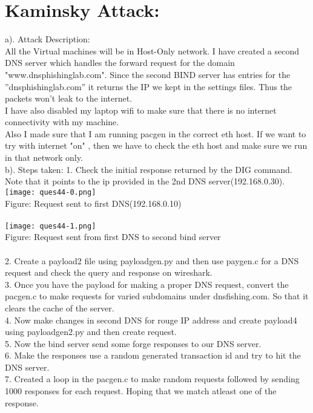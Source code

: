 \documentclass{article}
\begin{document}
\section{Kaminsky Attack:}
a). Attack Description:
\\All the Virtual machines will be in Host-Only network. I have created a second DNS server which handles the forward request for the domain "www.dnsphishinglab.com". Since the second BIND server has entries for the ”dnsphishinglab.com” it returns the IP we kept in the settings files. Thus the packets won’t leak to the internet.
\\I have also disabled my laptop wifi to make sure that there is no internet connectivity with my machine. \\
Also I made sure that I am running pacgen in the correct eth host. If we want to try with internet "on" , then we have to check the eth host and make sure we run in that network only.
\\
b). Steps taken:
1. Check the initial response returned by the DIG command. Note that it points to the ip provided in the 2nd DNS server(192.168.0.30).\\
\texttt{[image: ques44-0.png]}
\\Figure: Request sent to first DNS(192.168.0.10) 
 \\ \\
\texttt{[image: ques44-1.png]}
\\Figure: Request sent from first DNS  to second bind server
 \\ \\
2.  Create a payload2 file using payloadgen.py and then use paygen.c for a DNS request and check the query and response on wireshark.
\\
3. Once you have the payload for making a proper DNS request, convert the pacgen.c to make requests for varied subdomains under dnsfishing.com. So that it clears the cache of the server. \\
4. Now make changes in second DNS for rouge IP address and create payload4 using payloadgen2.py and then create request.
\\
5. Now the bind server send some forge responses to our DNS server. \\
6. Make the responses use a random generated transaction id and try to hit the DNS server.\\
7. Created a loop in the pacgen.c to make random requests followed by sending 1000 responses for each request. Hoping that we match atleast one of the response.\\
\end{document}
